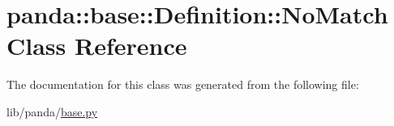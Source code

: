 \hypertarget{classpanda_1_1base_1_1Definition_1_1NoMatch}{
\section{panda::base::Definition::NoMatch Class Reference}
\label{classpanda_1_1base_1_1Definition_1_1NoMatch}
}


The documentation for this class was generated from the following file:\begin{DoxyCompactItemize}
\item 
lib/panda/\hyperlink{base_8py}{base.py}\end{DoxyCompactItemize}

